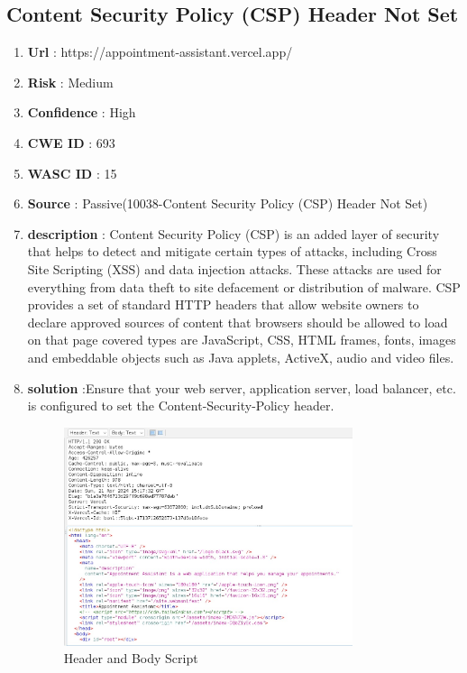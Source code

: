 \documentclass[openany]{report}
\begin{document}
\subsection{Content Security Policy (CSP) Header Not Set}
\begin{enumerate}
    \item \textbf{Url} : https://appointment-assistant.vercel.app/
    \item \textbf{Risk} : Medium
    \item \textbf{Confidence} : High
    \item \textbf{CWE ID} : 693
    \item \textbf{WASC ID} : 15
    \item \textbf{Source} : Passive(10038-Content Security Policy (CSP) Header Not Set)
    \item \textbf{description} : Content Security Policy (CSP) is an added layer of security that helps to detect and mitigate certain types of attacks, including Cross Site Scripting (XSS) and data injection attacks. These attacks are used for everything from data theft to site defacement or distribution of malware. CSP provides a set of standard HTTP headers that allow website owners to declare approved sources of content that browsers should be allowed to load on that page covered types are JavaScript, CSS, HTML frames, fonts, images and embeddable objects such as Java applets, ActiveX, audio and video files.
    \item \textbf{solution} :Ensure that your web server, application server, load balancer, etc. is configured to set the Content-Security-Policy header.
          \begin{figure}[H]
              \centering
              \includegraphics[width=0.8\textwidth]{imgs/2.jpg}
              \caption{ Header and Body Script}

\end{figure}
\end{enumerate}
\end{document}
